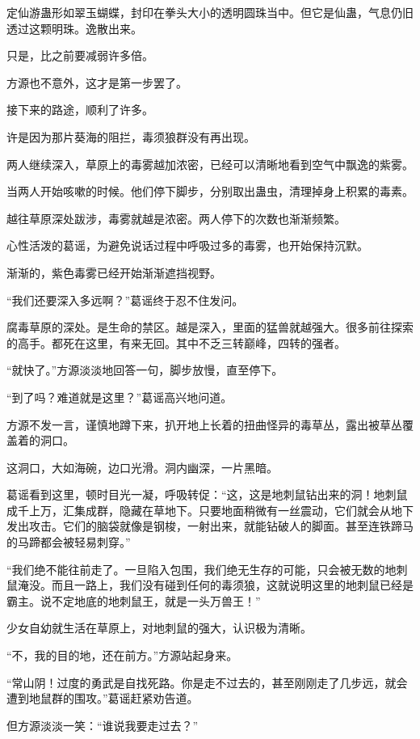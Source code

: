 \begin{this_body}
定仙游蛊形如翠玉蝴蝶，封印在拳头大小的透明圆珠当中。但它是仙蛊，气息仍旧透过这颗明珠。逸散出来。

只是，比之前要减弱许多倍。

方源也不意外，这才是第一步罢了。

接下来的路途，顺利了许多。

许是因为那片葵海的阻拦，毒须狼群没有再出现。

两人继续深入，草原上的毒雾越加浓密，已经可以清晰地看到空气中飘逸的紫雾。

当两人开始咳嗽的时候。他们停下脚步，分别取出蛊虫，清理掉身上积累的毒素。

越往草原深处跋涉，毒雾就越是浓密。两人停下的次数也渐渐频繁。

心性活泼的葛谣，为避免说话过程中呼吸过多的毒雾，也开始保持沉默。

渐渐的，紫色毒雾已经开始渐渐遮挡视野。

“我们还要深入多远啊？”葛谣终于忍不住发问。

腐毒草原的深处。是生命的禁区。越是深入，里面的猛兽就越强大。很多前往探索的高手。都死在这里，有来无回。其中不乏三转巅峰，四转的强者。

“就快了。”方源淡淡地回答一句，脚步放慢，直至停下。

“到了吗？难道就是这里？”葛谣高兴地问道。

方源不发一言，谨慎地蹲下来，扒开地上长着的扭曲怪异的毒草丛，露出被草丛覆盖着的洞口。

这洞口，大如海碗，边口光滑。洞内幽深，一片黑暗。

葛谣看到这里，顿时目光一凝，呼吸转促：“这，这是地刺鼠钻出来的洞！地刺鼠成千上万，汇集成群，隐藏在草地下。只要地面稍微有一丝震动，它们就会从地下发出攻击。它们的脑袋就像是钢梭，一射出来，就能钻破人的脚面。甚至连铁蹄马的马蹄都会被轻易刺穿。”

“我们绝不能往前走了。一旦陷入包围，我们绝无生存的可能，只会被无数的地刺鼠淹没。而且一路上，我们没有碰到任何的毒须狼，这就说明这里的地刺鼠已经是霸主。说不定地底的地刺鼠王，就是一头万兽王！”

少女自幼就生活在草原上，对地刺鼠的强大，认识极为清晰。

“不，我的目的地，还在前方。”方源站起身来。

“常山阴！过度的勇武是自找死路。你是走不过去的，甚至刚刚走了几步远，就会遭到地鼠群的围攻。”葛谣赶紧劝告道。

但方源淡淡一笑：“谁说我要走过去？”


\end{this_body}
